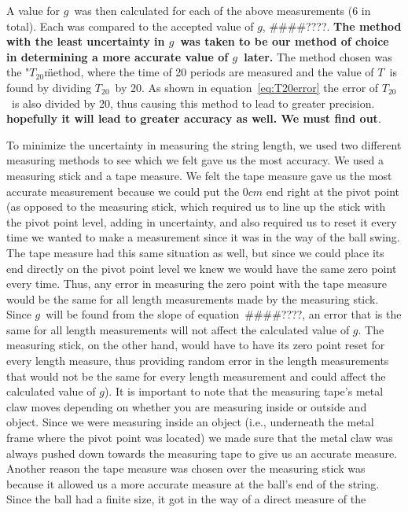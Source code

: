\documentclass[iop]{emulateapj}
\def\g{$g$}
\def\T{$T$}
\def\Ttwen{$T_{20}$}
\def\fillin{\#\#\#\#????}
\begin{document}
A value for \g\ was then calculated for each of the above measurements (6 in 
total). Each was compared to the accepted value of \g, \fillin.  {\bf The 
method with the least uncertainty in \g\ was taken to be our method of choice 
in determining a more accurate value of \g\ later.}  The method chosen was the 
"\Ttwen\" method, where the time of 20 periods are measured and the value of 
\T\ is found by dividing \Ttwen\ by 20.  As shown in 
equation~\ref{eq:T20error} the error of \Ttwen\ is also divided by 20, thus 
causing this method to lead to greater precision.  {\bf hopefully it will lead 
to greater accuracy as well.  We must find out}. 

To minimize the uncertainty in measuring the string length, we used two 
different measuring methods to see which we felt gave us the most accuracy. 
We used a measuring stick and a tape measure.  We felt the tape measure gave 
us the most accurate measurement because we could put the $0cm$ end right at 
the pivot point (as opposed to the measuring stick, which required us to line 
up the stick with the pivot point level, adding in uncertainty, and also 
required us to reset it every time we wanted to make a measurement since it 
was in the way of the ball swing. The tape measure had this same situation 
as well, but since we could place its end directly on the pivot point level 
we knew we would have the same zero point every time. Thus, any error in 
measuring the zero point with the tape measure would be the same for all 
length measurements made by the measuring stick.  Since \g\ will be found 
from the slope of equation~\fillin, an error that is the same for all length 
measurements will not affect the calculated value of \g.  The measuring stick, 
on the other hand, would have to have its zero point reset for every length 
measure, thus providing random error in the length measurements that would 
not be the same for every length measurement and could affect the calculated 
value of \g).  It is important to note that the measuring tape's metal claw 
moves depending on whether you are measuring inside or outside and object. 
Since we were measuring inside an object (i.e., underneath the metal frame 
where the pivot point was located) we made sure that the metal claw was always 
pushed down towards the measuring tape to give us an accurate measure.  
Another reason the tape measure was chosen over the measuring stick was 
because it allowed us a more accurate measure at the ball's end of the string. 
Since the ball had a finite size, it got in the way of a direct measure of the 
\end{document}
